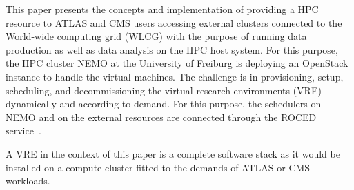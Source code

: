 This paper presents the concepts and implementation of providing a HPC resource
to ATLAS and CMS users accessing external clusters connected to the World-wide
computing grid (WLCG) with the purpose of running data production as well as
data analysis on the HPC host system.  For this purpose, the HPC cluster NEMO at
the University of Freiburg is deploying an OpenStack instance to handle the
virtual machines. The challenge is in provisioning, setup, scheduling, and decommissioning the virtual research environments (VRE) dynamically and according to demand. For this purpose, the schedulers on NEMO and on the external resources are
connected through the ROCED service~\cite{ROCED}.

A VRE in the context of this paper is a complete software stack
as it would be installed on a compute cluster fitted to the demands of ATLAS or CMS workloads.

